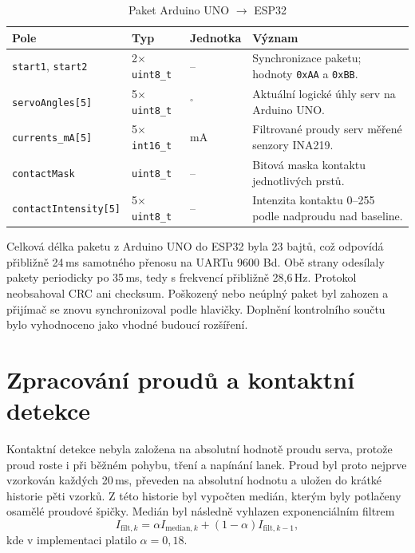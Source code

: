 \begin{table}[htbp]
\centering
\caption{Paket Arduino UNO $\rightarrow$ ESP32}
\label{tab:packet-uno-esp}
\begin{tabular}{|p{}|p{}|p{}|p{}|}
\hline
\textbf{Pole} & \textbf{Typ} & \textbf{Jednotka} & \textbf{Význam} \\
\hline
\texttt{start1}, \texttt{start2} & 2$\times$ \texttt{uint8\_t} & -- & Synchronizace paketu; hodnoty \texttt{0xAA} a \texttt{0xBB}. \\
\hline
\texttt{servoAngles[5]} & 5$\times$ \texttt{uint8\_t} & $^\circ$ & Aktuální logické úhly serv na Arduino UNO\@. \\
\hline
\texttt{currents\_mA[5]} & 5$\times$ \texttt{int16\_t} & mA & Filtrované proudy serv měřené senzory INA219. \\
\hline
\texttt{contactMask} & \texttt{uint8\_t} & -- & Bitová maska kontaktu jednotlivých prstů. \\
\hline
\texttt{contactIntensity[5]} & 5$\times$ \texttt{uint8\_t} & -- & Intenzita kontaktu 0--255 podle nadproudu nad baseline. \\
\hline
\end{tabular}
\end{table}

Celková délka paketu z Arduino UNO do ESP32 byla 23 bajtů, což odpovídá přibližně 24\,ms samotného přenosu na UARTu 9600 Bd. Obě strany odesílaly pakety periodicky po 35\,ms, tedy s frekvencí přibližně 28,6\,Hz. Protokol neobsahoval CRC ani checksum. Poškozený nebo neúplný paket byl zahozen a přijímač se znovu synchronizoval podle hlavičky. Doplnění kontrolního součtu bylo vyhodnoceno jako vhodné budoucí rozšíření.

\section{Zpracování proudů a kontaktní detekce}
\label{sec:kontaktova-detekce-hardware}

Kontaktní detekce nebyla založena na absolutní hodnotě proudu serva, protože proud roste i při běžném pohybu, tření a napínání lanek. Proud byl proto nejprve vzorkován každých 20\,ms, převeden na absolutní hodnotu a uložen do krátké historie pěti vzorků. Z této historie byl vypočten medián, kterým byly potlačeny osamělé proudové špičky. Medián byl následně vyhlazen exponenciálním filtrem
\begin{equation}
    I_{\mathrm{filt},k} =
    \alpha I_{\mathrm{median},k}
    + \left(1 - \alpha\right)I_{\mathrm{filt},k-1},
\end{equation}
kde v implementaci platilo $\alpha = 0{,}18$.

